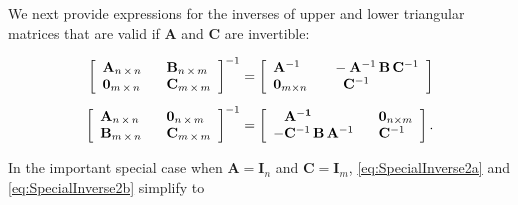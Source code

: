 \documentclass[graybox,envcountchap,sectrefs]{svmono}\usepackage[]{graphicx}\usepackage[]{xcolor}
\begin{document}
\begin{appendices}
We next provide expressions for the inverses of upper and lower triangular
matrices that are valid if $\mathrm{\mathbf{A}}$ and $\mathrm{\mathbf{C}}$
are invertible:

\begin{subequations}
\begin{align}
\left[\begin{array}{ll}
\mathrm{\mathbf{A}}_{n\,\times\,n} & \hphantom{-}\mathrm{\mathbf{B}}_{n\,\times\,m}\\
\mathbf{0}_{m\,\times\,n} & \hphantom{-}\mathrm{\mathbf{C}}_{m\,\times\,m}
\end{array}\right]^{-1} & =\left[\begin{array}{ll}
\mathbf{A}^{-1} & \mathrm{\hphantom{-}-\mathbf{A}^{-1}}\,\mathbf{B}\,\mathrm{\mathbf{C}}^{-1}\\
\mathbf{0}_{m\times n} & \hphantom{-}\mathrm{\hphantom{-}}\mathbf{C}^{-1}
\end{array}\right]\label{eq:SpecialInverse2a}\\[0.5em]
\left[\begin{array}{ll}
\mathrm{\mathbf{A}}_{n\,\times\,n} & \hphantom{-}\mathbf{0}_{n\,\times\,m}\\
\mathrm{\mathbf{B}}_{m\,\times\,n} & \hphantom{-}\mathrm{\mathbf{C}}_{m\,\times\,m}
\end{array}\right]^{-1} & =\left[\begin{array}{ll}
\hphantom{-}\mathrm{\mathbf{\mathbf{A}^{-1}}} & \hphantom{-}\mathbf{0}_{n\times m}\\
-\mathrm{\mathbf{C}}^{-1}\,\mathbf{B}\,\mathbf{A}^{-1} & \mathrm{\hphantom{-}}\mathbf{C}^{-1}
\end{array}\right].\label{eq:SpecialInverse2b}
\end{align}
\end{subequations}

In the important special case when $\mathrm{\mathbf{A}}=\mathrm{\mathbf{I}}_{n}$
and $\mathrm{\mathbf{C}}=\mathrm{\mathbf{I}}_{m}$, \eqref{eq:SpecialInverse2a}
and \eqref{eq:SpecialInverse2b} simplify to


\end{appendices}
\end{document}
